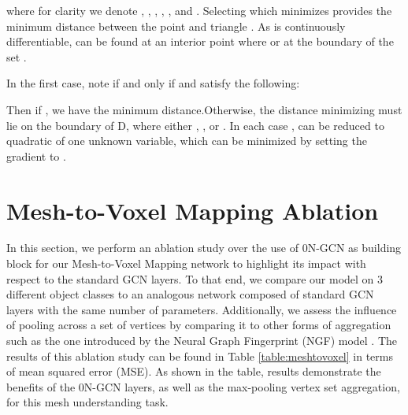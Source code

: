 \documentclass{article}
\begin{document}
where for clarity we denote  , , , , , and . Selecting  which minimizes  provides the minimum distance between the point  and triangle . As  is continuously differentiable,  can be found at an interior point where  or at the boundary of the set . 

In the first case, note  if and only if  and  satisfy the following:

Then if , we have the minimum distance.Otherwise, the distance minimizing  must lie on the boundary of D, where either , , or . In each case , can be reduced to quadratic of one unknown variable, which can be minimized by setting the gradient to .

\section{Mesh-to-Voxel Mapping Ablation}

In this section, we perform an ablation study over the use of 0N-GCN as building block for our Mesh-to-Voxel Mapping network to highlight its impact with respect to the standard GCN layers. To that end, we compare our model on 3 different object classes to an analogous network composed of standard GCN layers with the same number of parameters. Additionally, we assess the influence of pooling across a set of vertices by comparing it to other forms of aggregation such as the one introduced by the Neural Graph Fingerprint (NGF) model \cite{FingerPrint}. The results of this ablation study can be found in Table \ref{table:meshtovoxel} in terms of mean squared error (MSE). As shown in the table, results demonstrate the benefits of the 0N-GCN layers, as well as the max-pooling vertex set aggregation, for this mesh understanding task.

\begin{table}[h]
  
  \caption{Mesh-to-Voxel Mapping Reconstruction MSE scores.} \label{table:meshtovoxel}
  \vspace{0.2cm}
  \centering
  
\end{table}
\end{document}
